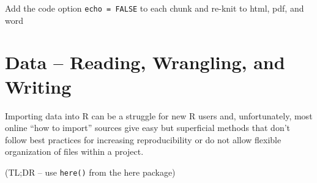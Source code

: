 \documentclass[]{book}
\begin{document}
Add the code option \texttt{echo\ =\ FALSE} to each chunk and re-knit to html, pdf, and word

\hypertarget{data-reading-wrangling-and-writing}{%
\chapter{Data -- Reading, Wrangling, and Writing}\label{data-reading-wrangling-and-writing}}

Importing data into R can be a struggle for new R users and, unfortunately, most online ``how to import'' sources give easy but superficial methods that don't follow best practices for increasing reproducibility or do not allow flexible organization of files within a project.

(TL;DR -- use \texttt{here()} from the here package)
\end{document}

